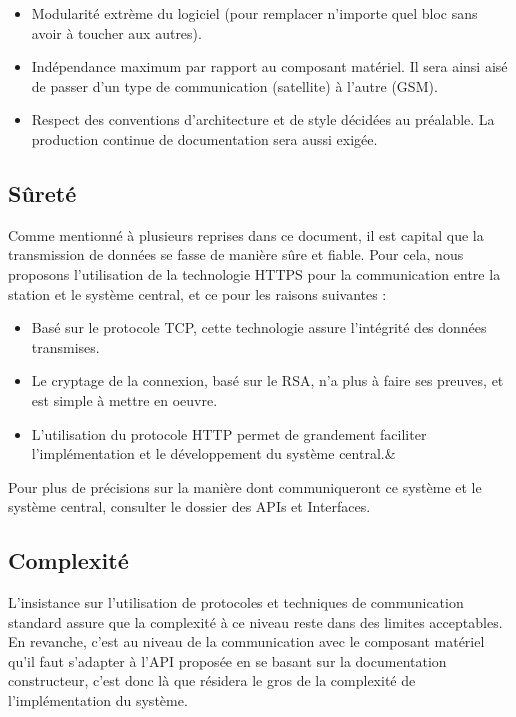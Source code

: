 \begin{itemize}
\item Modularité extrème du logiciel (pour remplacer n'importe quel bloc sans avoir à toucher aux autres).
\item Indépendance maximum par rapport au composant matériel. Il sera ainsi aisé de passer d'un type de communication (satellite) à l'autre (GSM).
\item Respect des conventions d'architecture et de style décidées au préalable. La production continue de documentation sera aussi exigée.
\end{itemize}


\subsection{Sûreté}

Comme mentionné à plusieurs reprises dans ce document, il est capital que la transmission de données se fasse de manière sûre et fiable. Pour cela, nous proposons l'utilisation de la technologie HTTPS pour la communication entre la station et le système central, et ce pour les raisons suivantes :

\begin{itemize}
\item Basé sur le protocole TCP, cette technologie assure l'intégrité des données transmises.
\item Le cryptage de la connexion, basé sur le RSA, n'a plus à faire ses preuves, et est simple à mettre en oeuvre.
\item L'utilisation du protocole HTTP permet de grandement faciliter l'implémentation et le développement du système central.&
\end{itemize}

Pour plus de précisions sur la manière dont communiqueront ce système et le système central, consulter le dossier des APIs et Interfaces.

\subsection{Complexité}

L'insistance sur l'utilisation de protocoles et techniques de communication standard assure que la complexité à ce niveau reste dans des limites acceptables. En revanche, c'est au niveau de la communication avec le composant matériel qu'il faut s'adapter à l'API proposée en se basant sur la documentation constructeur, c'est donc là que résidera le gros de la complexité de l'implémentation du système.

